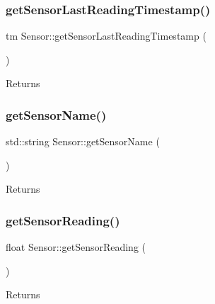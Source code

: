 \subsubsection{\texorpdfstring{get\+Sensor\+Last\+Reading\+Timestamp()}{getSensorLastReadingTimestamp()}}
{\footnotesize\ttfamily tm Sensor\+::get\+Sensor\+Last\+Reading\+Timestamp (\begin{DoxyParamCaption}{ }\end{DoxyParamCaption})}





\begin{DoxyReturn}{Returns}

\end{DoxyReturn}
\mbox{\label{class_sensor_aa8250e5192cfd751fad294930fabf92b}} 
\subsubsection{\texorpdfstring{get\+Sensor\+Name()}{getSensorName()}}
{\footnotesize\ttfamily std\+::string Sensor\+::get\+Sensor\+Name (\begin{DoxyParamCaption}{ }\end{DoxyParamCaption})}





\begin{DoxyReturn}{Returns}

\end{DoxyReturn}
\mbox{\label{class_sensor_a399de2e826af7fe32a579f93dbfad1b2}} 
\subsubsection{\texorpdfstring{get\+Sensor\+Reading()}{getSensorReading()}}
{\footnotesize\ttfamily float Sensor\+::get\+Sensor\+Reading (\begin{DoxyParamCaption}{ }\end{DoxyParamCaption})}





\begin{DoxyReturn}{Returns}

\end{DoxyReturn}
\mbox{\label{class_sensor_ad59209d7c8aed356ba8aa2ff832c37cc}} 
